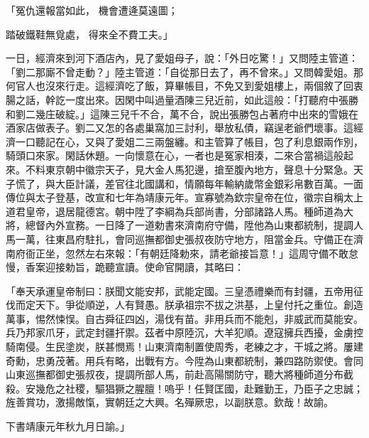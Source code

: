 \begin{showcontents}{}
「冤仇還報當如此，  機會遭逄莫遠圖；

踏破鐵鞋無覓處，  得來全不費工夫。」

一日，經濟來到河下酒店內，見了愛姐母子，說：「外日吃驚！」又問陸主管道：「劉二那廝不曾走動？」陸主管道：「自從那日去了，再不曾來。」又問韓愛姐。那何官人也沒來行走。這經濟吃了飯，算畢帳目，不免又到愛姐樓上，兩個敘了回衷腸之話，幹訖一度出來。因閑中叫過量酒陳三兒近前，如此這般：「打聽府中張勝和劉二幾庄破綻。」這陳三兒千不合，萬不合，說出張勝包占著府中出來的雪娥在酒家店做表子。劉二又怎的各處巢窩加三討利，舉放私債，竊逞老爺們壞事。這經濟一口聽記在心，又與了愛姐二三兩盤纏。和主管算了帳目，包了利息銀兩作別，騎頭口來家。閑話休題。一向懷意在心，一者也是冤家相湊，二來合當禍這般起來。不料東京朝中徽宗天子，見大金人馬犯邊，搶至腹內地方，聲息十分緊急。天子慌了，與大臣計議，差官往北國講和，情願每年輸納歲幣金銀彩帛數百萬。一面傳位與太子登基，改宣和七年為靖康元年。宣寡號為欽宗皇帝在位，徽宗自稱太上道君皇帝，退居龍德宮。朝中陞了李綱為兵部尚書，分部諸路人馬。種師道為大將，總督內外宣務。一日降了一道勅書來濟南府守備，陞他為山東都統制，提調人馬一萬，往東昌府駐扎，會同巡撫都御史張叔夜防守地方，阻當金兵。守備正在濟南府衙正坐，忽然左右來報：「有朝廷降勅來，請老爺接旨意！」這周守備不敢怠慢，香案迎接勅旨，跪聽宣讀。使命官開讀，其略曰：

「奉天承運皇帝制曰：朕聞文能安邦，武能定國。三皇憑禮樂而有封疆，五帝用征伐而定天下。爭從順逆，人有賢愚。朕承祖宗不拔之洪基，上皇付托之重位。創造萬事，惕然悚悮。自古舜征四凶，湯伐有苗。非用兵而不能剋，非威武而莫能安。兵乃邦家爪牙，武定封疆扞禦。茲者中原陸沉，大羊犯順。遼寇擁兵西擾，金虜控騎南侵。生民塗炭，朕甚憫焉！山東濟南制置使周秀，老練之才，干城之將。屢建奇勳，忠勇茂著。用兵有略，出戰有方。今陞為山東都統制，兼四路防禦使。會同山東巡撫都御史張叔夜，提調所部人馬，前赴高陽關防守，聽大將種師道分布截殺。安幾危之社稷，驅猖獗之腥膻！嗚乎！任賢匡國，赴難勤王，乃臣子之忠誠；旌善賞功，激揚敵愾，實朝廷之大興。名殫厥忠，以副朕意。欽哉！故諭。

下書靖康元年秋九月日諭。」


\end{showcontents}
